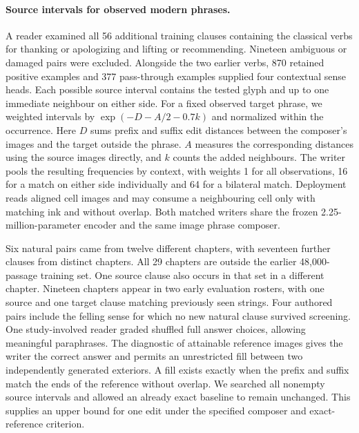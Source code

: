 \paragraph{Source intervals for observed modern phrases.}
A reader examined all 56 additional training clauses containing the classical verbs for thanking or apologizing and lifting or recommending. Nineteen ambiguous or damaged pairs were excluded. Alongside the two earlier verbs, 870 retained positive examples and 377 pass-through examples supplied four contextual sense heads. Each possible source interval contains the tested glyph and up to one immediate neighbour on either side. For a fixed observed target phrase, we weighted intervals by $\exp(-D-A/2-0.7k)$ and normalized within the occurrence. Here $D$ sums prefix and suffix edit distances between the composer's images and the target outside the phrase. $A$ measures the corresponding distances using the source images directly, and $k$ counts the added neighbours. The writer pools the resulting frequencies by context, with weights 1 for all observations, 16 for a match on either side individually and 64 for a bilateral match. Deployment reads aligned cell images and may consume a neighbouring cell only with matching ink and without overlap. Both matched writers share the frozen 2.25-million-parameter encoder and the same image phrase composer.

Six natural pairs came from twelve different chapters, with seventeen further clauses from distinct chapters. All 29 chapters are outside the earlier 48,000-passage training set. One source clause also occurs in that set in a different chapter. Nineteen chapters appear in two early evaluation rosters, with one source and one target clause matching previously seen strings. Four authored pairs include the felling sense for which no new natural clause survived screening. One study-involved reader graded shuffled full answer choices, allowing meaningful paraphrases. The diagnostic of attainable reference images gives the writer the correct answer and permits an unrestricted fill between two independently generated exteriors. A fill exists exactly when the prefix and suffix match the ends of the reference without overlap. We searched all nonempty source intervals and allowed an already exact baseline to remain unchanged. This supplies an upper bound for one edit under the specified composer and exact-reference criterion.
